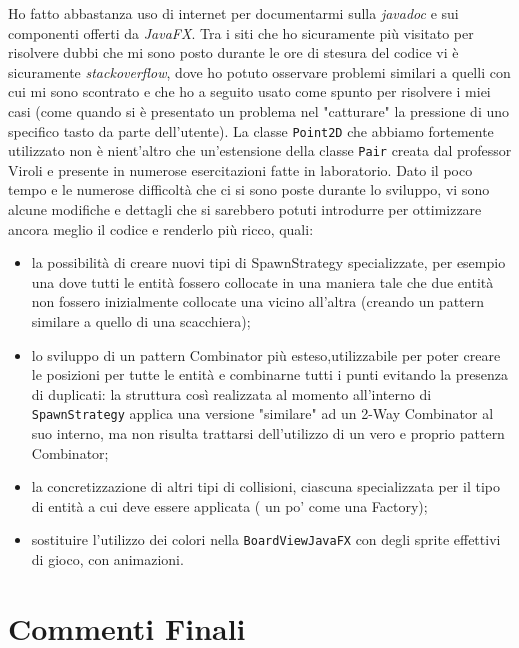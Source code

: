 \documentclass[a4paper,12pt]{report}
\begin{document}
Ho fatto abbastanza uso di internet per documentarmi sulla \textit{javadoc} e sui componenti offerti da \textit{JavaFX}. Tra i siti che ho sicuramente più visitato per risolvere dubbi che mi sono posto durante le ore di stesura del codice vi è sicuramente \textit{stackoverflow}, dove ho potuto osservare problemi similari a quelli con cui mi sono scontrato e che ho a seguito usato come spunto per risolvere i miei casi (come quando si è presentato un problema nel "catturare" la pressione di uno specifico tasto da parte dell'utente). La classe \verb|Point2D| che abbiamo fortemente utilizzato non è nient'altro che un'estensione della classe \verb|Pair| creata dal professor Viroli e presente in numerose esercitazioni fatte in laboratorio.
Dato il poco tempo e le numerose difficoltà che ci si sono poste durante lo sviluppo, vi sono alcune modifiche e dettagli che si sarebbero potuti introdurre per ottimizzare ancora meglio il codice e renderlo più ricco, quali:
\begin{itemize}
    \item la possibilità di creare nuovi tipi di SpawnStrategy specializzate, per esempio una dove tutti le entità fossero collocate in una maniera tale che due entità non fossero inizialmente collocate una vicino all'altra (creando un pattern similare a quello di una scacchiera);
    \item lo sviluppo di un pattern Combinator più esteso,utilizzabile per poter creare le posizioni per tutte le entità e combinarne tutti i punti evitando la presenza di duplicati: la struttura così realizzata al momento all'interno di \verb|SpawnStrategy| applica una versione "similare" ad un 2-Way Combinator al suo interno, ma non risulta trattarsi dell'utilizzo di un vero e proprio pattern Combinator;
    \item la concretizzazione di altri tipi di collisioni, ciascuna specializzata per il tipo di entità a cui deve essere applicata ( un po' come una Factory);
    \item sostituire l'utilizzo dei colori nella \verb|BoardViewJavaFX| con degli sprite effettivi di gioco, con animazioni.
\end{itemize}

\chapter{Commenti Finali}
\end{document}
